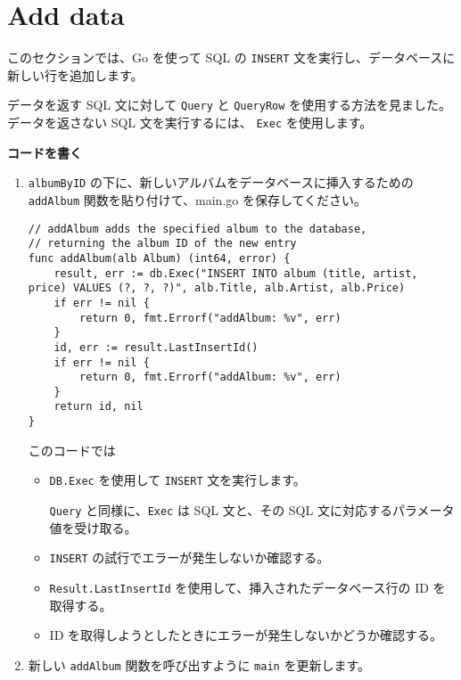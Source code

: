 \section{Add data}

このセクションでは、Go を使って SQL の \texttt{INSERT}
文を実行し、データベースに新しい行を追加します。

データを返す SQL 文に対して \texttt{Query} と \texttt{QueryRow}
を使用する方法を見ました。データを返さない SQL 文を実行するには、
\texttt{Exec} を使用します。

\textbf{コードを書く}



\begin{enumerate}

\item
  \texttt{albumByID}
  の下に、新しいアルバムをデータベースに挿入するための \texttt{addAlbum}
  関数を貼り付けて、main.go を保存してください。

\begin{lstlisting}[numbers=none]
// addAlbum adds the specified album to the database,
// returning the album ID of the new entry
func addAlbum(alb Album) (int64, error) {
    result, err := db.Exec("INSERT INTO album (title, artist, price) VALUES (?, ?, ?)", alb.Title, alb.Artist, alb.Price)
    if err != nil {
        return 0, fmt.Errorf("addAlbum: %v", err)
    }
    id, err := result.LastInsertId()
    if err != nil {
        return 0, fmt.Errorf("addAlbum: %v", err)
    }
    return id, nil
}
\end{lstlisting}

  このコードでは

  \begin{itemize}
  \item
    \texttt{DB.Exec} を使用して \texttt{INSERT} 文を実行します。

    \texttt{Query} と同様に、\texttt{Exec} は SQL 文と、その SQL
    文に対応するパラメータ値を受け取る。
  \item
    \texttt{INSERT} の試行でエラーが発生しないか確認する。
  \item
    \texttt{Result.LastInsertId} を使用して、挿入されたデータベース行の
    ID を取得する。
  \item
    ID を取得しようとしたときにエラーが発生しないかどうか確認する。
  \end{itemize}



\item
  新しい \texttt{addAlbum} 関数を呼び出すように \texttt{main}
  を更新します。


\end{enumerate}
